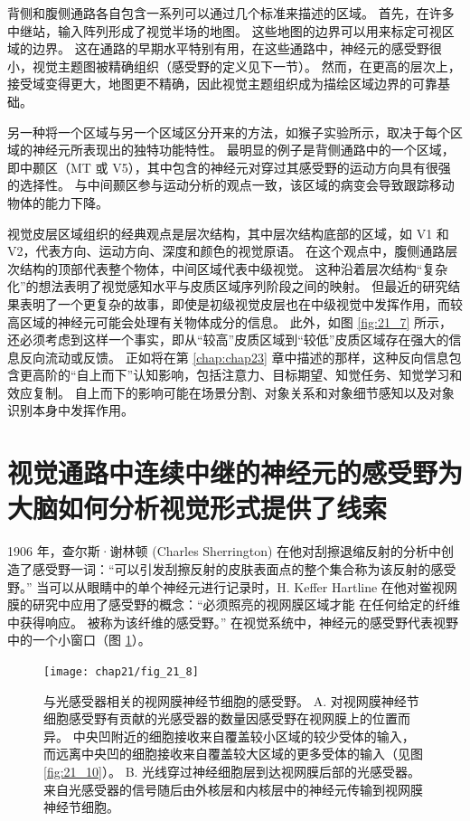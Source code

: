 背侧和腹侧通路各自包含一系列可以通过几个标准来描述的区域。 
首先，在许多中继站，输入阵列形成了视觉半场的地图。 
这些地图的边界可以用来标定可视区域的边界。 
这在通路的早期水平特别有用，在这些通路中，神经元的感受野很小，视觉主题图被精确组织（感受野的定义见下一节）。 
然而，在更高的层次上，接受域变得更大，地图更不精确，因此视觉主题组织成为描绘区域边界的可靠基础。


另一种将一个区域与另一个区域区分开来的方法，如猴子实验所示，取决于每个区域的神经元所表现出的独特功能特性。 
最明显的例子是背侧通路中的一个区域，即中颞区（MT 或 V5），其中包含的神经元对穿过其感受野的运动方向具有很强的选择性。 
与中间颞区参与运动分析的观点一致，该区域的病变会导致跟踪移动物体的能力下降。


视觉皮层区域组织的经典观点是层次结构，其中层次结构底部的区域，如 V1 和 V2，代表方向、运动方向、深度和颜色的视觉原语。 
在这个观点中，腹侧通路层次结构的顶部代表整个物体，中间区域代表中级视觉。 
这种沿着层次结构“复杂化”的想法表明了视觉感知水平与皮质区域序列阶段之间的映射。
但最近的研究结果表明了一个更复杂的故事，即使是初级视觉皮层也在中级视觉中发挥作用，而较高区域的神经元可能会处理有关物体成分的信息。 
此外，如图 \ref{fig:21_7} 所示，还必须考虑到这样一个事实，即从“较高”皮质区域到“较低”皮质区域存在强大的信息反向流动或反馈。 
正如将在第 \ref{chap:chap23} 章中描述的那样，这种反向信息包含更高阶的“自上而下”认知影响，包括注意力、目标期望、知觉任务、知觉学习和效应复制。 
自上而下的影响可能在场景分割、对象关系和对象细节感知以及对象识别本身中发挥作用。


\section{视觉通路中连续中继的神经元的感受野为大脑如何分析视觉形式提供了线索}
1906 年，查尔斯·谢林顿 (Charles Sherrington) 在他对刮擦退缩反射的分析中创造了感受野一词：“可以引发刮擦反射的皮肤表面点的整个集合称为该反射的感受野。” 
当可以从眼睛中的单个神经元进行记录时，H. Keffer Hartline 在他对鲎视网膜的研究中应用了感受野的概念：“必须照亮的视网膜区域才能 在任何给定的纤维中获得响应。
被称为该纤维的感受野。” 
在视觉系统中，神经元的感受野代表视野中的一个小窗口（图 \ref{fig:21_8}）。

\begin{figure}[htbp]
	\centering
	\texttt{[image: chap21/fig\_21\_8]}
	\caption{与光感受器相关的视网膜神经节细胞的感受野。 
		A. 对视网膜神经节细胞感受野有贡献的光感受器的数量因感受野在视网膜上的位置而异。 
		中央凹附近的细胞接收来自覆盖较小区域的较少受体的输入，而远离中央凹的细胞接收来自覆盖较大区域的更多受体的输入（见图 \ref{fig:21_10}）。 
		B. 光线穿过神经细胞层到达视网膜后部的光感受器。 
		来自光感受器的信号随后由外核层和内核层中的神经元传输到视网膜神经节细胞。}
	\label{fig:21_8}
\end{figure}


